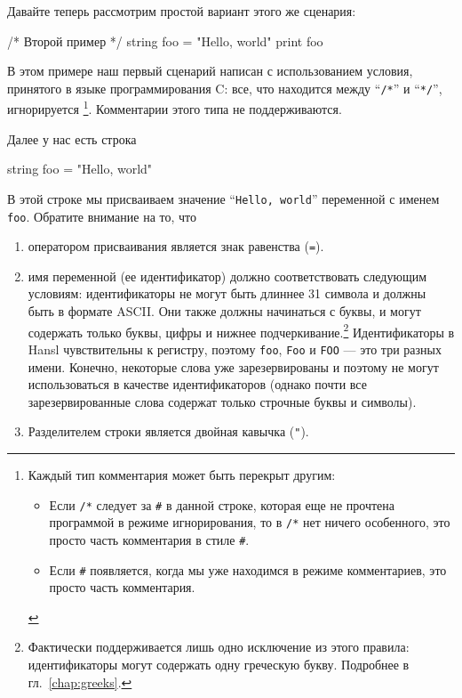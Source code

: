 Давайте теперь рассмотрим простой вариант этого же сценария:
\begin{code}
  /*
    Второй пример
  */
  string foo = "Hello, world"
  print foo
\end{code}

В этом примере наш первый сценарий написан с использованием условия,
принятого в языке программирования C: все, что находится между
``\verb|/*|'' и ``\verb|*/|'', игнорируется \footnote{Каждый тип
  комментария может быть перекрыт другим:
	\begin{itemize}
        \item Если \texttt{/*} следует за \texttt{\#} в данной строке,
          которая еще не прочтена программой в режиме игнорирования,
          то в \texttt{/*} нет ничего особенного, это просто часть
          комментария в стиле \texttt{\#}.
        \item Если \texttt{\#} появляется, когда мы уже находимся в
          режиме комментариев, это просто часть комментария.
\end{itemize}}. Комментарии этого типа не поддерживаются.

Далее у нас есть строка
\begin{code}
  string foo = "Hello, world"
\end{code}
В этой строке мы присваиваем значение ``\texttt{Hello, world}''
переменной с именем \texttt{foo}. Обратите внимание на то, что
\begin{enumerate}
\item оператором присваивания является знак равенства (\texttt{=}).
\item имя переменной (ее идентификатор) должно соответствовать
  следующим условиям: идентификаторы не могут быть длиннее 31 символа
  и должны быть в формате ASCII. Они также должны начинаться с буквы,
  и могут содержать только буквы, цифры и нижнее
  подчеркивание.\footnote{Фактически поддерживается лишь одно
    исключение из этого правила: идентификаторы могут содержать одну
    греческую букву. Подробнее в гл.~\ref{chap:greeks}.}
  Идентификаторы в Hansl чувствительны к регистру, поэтому
  \texttt{foo}, \texttt{Foo} и \texttt{FOO} --- это три разных
  имени. Конечно, некоторые слова уже зарезервированы и поэтому не
  могут использоваться в качестве идентификаторов (однако почти все
  зарезервированные слова содержат только строчные буквы и символы).
\item Разделителем строки является двойная кавычка (\verb|"|). 
\end{enumerate}

